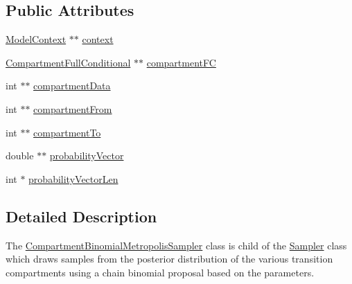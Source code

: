 \subsection*{Public Attributes}
\begin{DoxyCompactItemize}
\item 
\hyperlink{classSpatialSEIR_1_1ModelContext}{Model\-Context} $\ast$$\ast$ \hyperlink{classSpatialSEIR_1_1CompartmentBinomialMetropolisSampler_aa8e8332272c23e296ff8f3f6d9b6b9a2}{context}
\item 
\hyperlink{classSpatialSEIR_1_1CompartmentFullConditional}{Compartment\-Full\-Conditional} $\ast$$\ast$ \hyperlink{classSpatialSEIR_1_1CompartmentBinomialMetropolisSampler_a5ba83648853edd9ccf7e0e33e22b1d93}{compartment\-F\-C}
\item 
int $\ast$$\ast$ \hyperlink{classSpatialSEIR_1_1CompartmentBinomialMetropolisSampler_a05f080ab0846309ba240b1819249cb9c}{compartment\-Data}
\item 
int $\ast$$\ast$ \hyperlink{classSpatialSEIR_1_1CompartmentBinomialMetropolisSampler_a2927a09c8c50447fe863506c1e6e1a10}{compartment\-From}
\item 
int $\ast$$\ast$ \hyperlink{classSpatialSEIR_1_1CompartmentBinomialMetropolisSampler_a4b6410cc9b98d13ef261497292ba6518}{compartment\-To}
\item 
double $\ast$$\ast$ \hyperlink{classSpatialSEIR_1_1CompartmentBinomialMetropolisSampler_a6a93966308715d47f53c972b5f7e385b}{probability\-Vector}
\item 
int $\ast$ \hyperlink{classSpatialSEIR_1_1CompartmentBinomialMetropolisSampler_adad677ace3b19726b377834fcd78b857}{probability\-Vector\-Len}
\end{DoxyCompactItemize}


\subsection{Detailed Description}
The \hyperlink{classSpatialSEIR_1_1CompartmentBinomialMetropolisSampler}{Compartment\-Binomial\-Metropolis\-Sampler} class is child of the \hyperlink{classSpatialSEIR_1_1Sampler}{Sampler} class which draws samples from the posterior distribution of the various transition compartments using a chain binomial proposal based on the parameters. 


